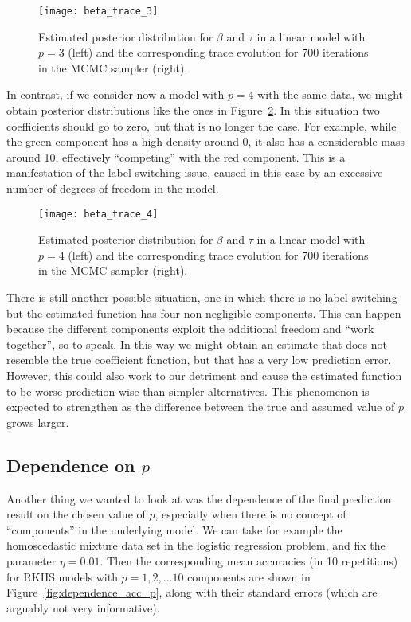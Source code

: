 \begin{figure}[ht!]
  \centering
  \texttt{[image: beta\_trace\_3]}
  \caption{Estimated posterior distribution for \(\beta\) and \(\tau\) in a linear model with \(p=3\) (left) and the corresponding trace evolution for 700 iterations in the MCMC sampler (right).}\label{fig:beta_trace_3}
\end{figure}

In contrast, if we consider now a model with \(p=4\) with the same data, we might obtain posterior distributions like the ones in Figure~\ref{fig:beta_trace_4}. In this situation two coefficients should go to zero, but that is no longer the case. For example, while the green component has a high density around 0, it also has a considerable mass around 10, effectively ``competing'' with the red component. This is a manifestation of the label switching issue, caused in this case by an excessive number of degrees of freedom in the model.

\begin{figure}[ht!]
  \centering
  \texttt{[image: beta\_trace\_4]}
  \caption{Estimated posterior distribution for \(\beta\) and \(\tau\) in a linear model with \(p=4\) (left) and the corresponding trace evolution for 700 iterations in the MCMC sampler (right).}\label{fig:beta_trace_4}
\end{figure}

There is still another possible situation, one in which there is no label switching but the estimated function has four non-negligible components. This can happen because the different components exploit the additional freedom and ``work together'', so to speak. In this way we might obtain an estimate that does not resemble the true coefficient function, but that has a very low prediction error. However, this could also work to our detriment and cause the estimated function to be worse prediction-wise than simpler alternatives. This phenomenon is expected to strengthen as the difference between the true and assumed value of \(p\) grows larger.

\subsection*{Dependence on \(p\)}

Another thing we wanted to look at was the dependence of the final prediction result on the chosen value of \(p\), especially when there is no concept of ``components'' in the underlying model. We can take for example the homoscedastic mixture data set in the logistic regression problem, and fix the parameter \(\eta=0.01\). Then the corresponding mean accuracies (in 10 repetitions) for RKHS models with \(p=1,2,\dots 10\) components are shown in Figure~\ref{fig:dependence_acc_p}, along with their standard errors (which are arguably not very informative).

